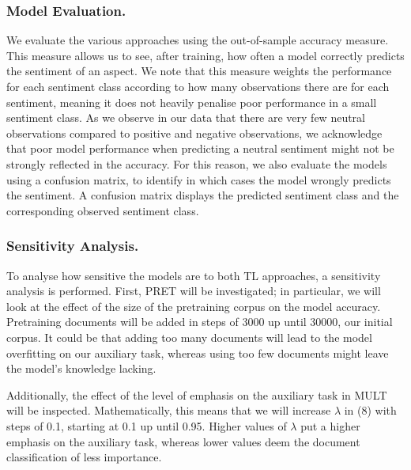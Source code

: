 \subsubsection{Model Evaluation.}

We evaluate the various approaches using the out-of-sample accuracy measure. This measure allows us to see, after training, how often a model correctly predicts the sentiment of an aspect. We note that this measure weights the performance for each sentiment class according to how many observations there are for each sentiment, meaning it does not heavily penalise poor performance in a small sentiment class. As we observe in our data that there are very few neutral observations compared to positive and negative observations, we acknowledge that poor model performance when predicting a neutral sentiment might not be strongly reflected in the accuracy. For this reason, we also evaluate the models using a confusion matrix, to identify in which cases the model wrongly predicts the sentiment. A confusion matrix displays the predicted sentiment class and the corresponding observed sentiment class.

\subsubsection{Sensitivity Analysis.}

To analyse how sensitive the models are to both TL approaches, a sensitivity analysis is performed. First, PRET will be investigated; in particular, we will look at the effect of the size of the pretraining corpus on the model accuracy. Pretraining documents will be added in steps of 3000 up until 30000, our initial corpus. It could be that adding too many documents will lead to the model overfitting on our auxiliary task, whereas using too few documents might leave the model's knowledge lacking.

Additionally, the effect of the level of emphasis on the auxiliary task in MULT will be inspected. Mathematically, this means that we will increase $\lambda$ in (8) with steps of 0.1, starting at 0.1 up until 0.95. Higher values of $\lambda$ put a higher emphasis on the auxiliary task, whereas lower values deem the document classification of less importance. 
